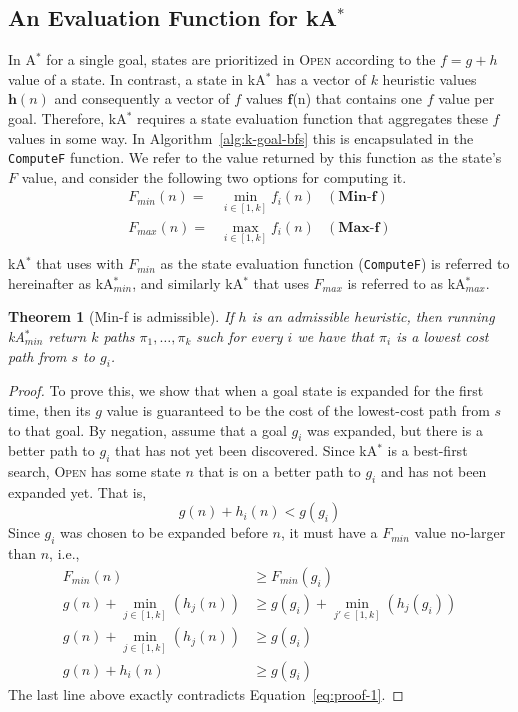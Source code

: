 \documentclass{aicom2e}
\newtheorem{theorem}{Theorem}
\newcommand{\astar}{A$^*$}
\newcommand{\kastar}{kA$^*$}
\newcommand{\kastarmin}{kA$^*_{min}$}
\newcommand{\kastarmax}{kA$^*_{max}$}
\newcommand{\minf}{Min-f}
\newcommand{\maxf}{Max-f}
\newcommand{\open}{\textsc{Open}}
\begin{document}
\subsection{An Evaluation Function for \kastar{}}
In \astar{} for a single goal, states are prioritized in \open{} according to the $f=g+h$ value of a state. 
In contrast, a state in \kastar{} has a vector of $k$ heuristic values $\textbf{h}(n)$ and 
consequently a vector of $f$ values $\textbf{f}$(n) that contains one $f$ value per goal. Therefore, \kastar{} requires a state evaluation function that aggregates these $f$ values in some way. In Algorithm~\ref{alg:k-goal-bfs} this is encapsulated in the {\tt ComputeF} function. We refer to the value returned by this function as the state's $F$ value, and consider the following two options for computing it. 
\begin{align}
F_{min}(n)=&\min_{i\in [1,k]}f_i(n) & (\textbf{\minf})\\ 
F_{max}(n)=&\max_{i\in [1,k]}f_i(n) & (\textbf{\maxf})\\ 
\end{align}
\kastar{} that uses with $F_{min}$ as the state evaluation function ({\tt ComputeF}) 
is referred to hereinafter as \kastarmin{}, and similarly \kastar{} that uses $F_{max}$ is referred to 
as \kastarmax{}.
 


\begin{theorem}[\minf{} is admissible]
If $h$ is an admissible heuristic, then running \kastarmin{} return $k$ paths $\pi_1,\ldots, \pi_k$ such for every $i$ we have that $\pi_i$ is a lowest cost path from $s$ to $g_i$. 
\label{the:min-f}
\end{theorem}
 \begin{proof}
To prove this, we show that when a goal state is expanded for the first time, then its $g$ value is guaranteed to 
be the cost of the lowest-cost path from $s$ to that goal. 
By negation, assume that a goal $g_i$ was expanded, but there is a better path to $g_i$
that has not yet been discovered. Since \kastar{} is a best-first search, \open{} has some state $n$ that is on a better path to $g_i$ and has not been expanded yet. 
That is, 
\begin{equation}
g(n)+h_i(n)<g(g_i)
\label{eq:proof-1}
\end{equation}
Since $g_i$ was chosen to be expanded before $n$, it must have a $F_{min}$ value no-larger than $n$, i.e.,
\begin{align}
F_{min}(n) &\geq  F_{min}(g_i)\\
g(n)+\min_{j\in [1,k]}(h_j(n))& \geq  g(g_i)+\min_{j'\in [1,k]}(h_j(g_i))\\
g(n)+\min_{j\in [1,k]}(h_j(n))& \geq  g(g_i)\\
g(n)+h_i(n) &\geq  g(g_i) 
\end{align}
The last line above exactly contradicts Equation~\ref{eq:proof-1}. 
\end{proof}
\end{document}
